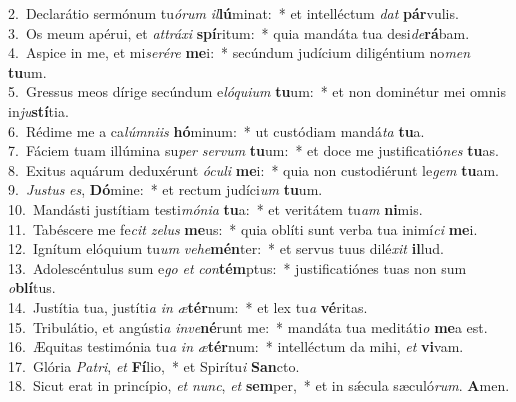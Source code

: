 {2.~}Declarátio sermónum tu\textit{ó}\textit{rum} \textit{il}\textbf{lú}minat:~* et intelléctum \textit{dat} \textbf{pár}vulis.\\
{3.~}Os meum apérui, et \textit{at}\textit{trá}\textit{xi} \textbf{spí}ritum:~* quia mandáta tua desi\textit{de}\textbf{rá}bam.\\
{4.~}Aspice in me, et mi\textit{se}\textit{ré}\textit{re} \textbf{me}i:~* secúndum judícium diligéntium no\textit{men} \textbf{tu}um.\\
{5.~}Gressus meos dírige secúndum e\textit{ló}\textit{qui}\textit{um} \textbf{tu}um:~* et non dominétur mei omnis in\textit{ju}\textbf{stí}tia.\\
{6.~}Rédime me a ca\textit{lúm}\textit{ni}\textit{is} \textbf{hó}minum:~* ut custódiam mandá\textit{ta} \textbf{tu}a.\\
{7.~}Fáciem tuam illúmina su\textit{per} \textit{ser}\textit{vum} \textbf{tu}um:~* et doce me justificatió\textit{nes} \textbf{tu}as.\\
{8.~}Exitus aquárum deduxérunt \textit{ó}\textit{cu}\textit{li} \textbf{me}i:~* quia non custodiérunt le\textit{gem} \textbf{tu}am.\\
{9.~}\textit{Ju}\textit{stus} \textit{es}, \textbf{Dó}mine:~* et rectum judíci\textit{um} \textbf{tu}um.\\
{10.~}Mandásti justítiam testi\textit{mó}\textit{ni}\textit{a} \textbf{tu}a:~* et veritátem tu\textit{am} \textbf{ni}mis.\\
{11.~}Tabéscere me fe\textit{cit} \textit{ze}\textit{lus} \textbf{me}us:~* quia oblíti sunt verba tua inimí\textit{ci} \textbf{me}i.\\
{12.~}Ignítum elóquium tu\textit{um} \textit{ve}\textit{he}\textbf{mén}ter:~* et servus tuus dilé\textit{xit} \textbf{il}lud.\\
{13.~}Adolescéntulus sum e\textit{go} \textit{et} \textit{con}\textbf{tém}ptus:~* justificatiónes tuas non sum \textit{o}\textbf{blí}tus.\\
{14.~}Justítia tua, justíti\textit{a} \textit{in} \textit{æ}\textbf{tér}num:~* et lex tu\textit{a} \textbf{vé}ritas.\\
{15.~}Tribulátio, et angústi\textit{a} \textit{in}\textit{ve}\textbf{né}runt me:~* mandáta tua meditáti\textit{o} \textbf{me}a est.\\
{16.~}Æquitas testimónia tu\textit{a} \textit{in} \textit{æ}\textbf{tér}num:~* intelléctum da mihi, \textit{et} \textbf{vi}vam.\\
{17.~}Glória \textit{Pa}\textit{tri}, \textit{et} \textbf{Fí}lio,~* et Spirítu\textit{i} \textbf{San}cto.\\
{18.~}Sicut erat in princípio, \textit{et} \textit{nunc}, \textit{et} \textbf{sem}per,~* et in sǽcula sæculó\textit{rum}. \textbf{A}men.\\
